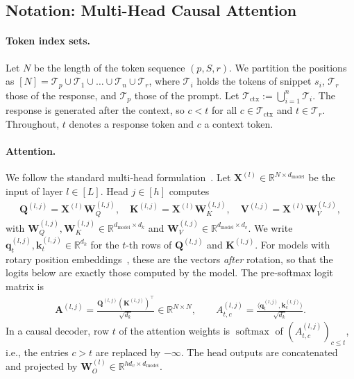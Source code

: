 \documentclass{article}
\begin{document}
\subsection{Notation: Multi-Head Causal Attention}
\label{subsec:attention_notation}

\paragraph{Token index sets.}
Let $N$ be the length of the token sequence $(p, S, r)$. We partition the positions as $[N] = \mathcal{T}_p \cup \mathcal{T}_1 \cup \dots \cup \mathcal{T}_n \cup \mathcal{T}_r$, where $\mathcal{T}_i$ holds the tokens of snippet $s_i$, $\mathcal{T}_r$ those of the response, and $\mathcal{T}_p$ those of the prompt. Let $\mathcal{T}_{\text{ctx}} := \bigcup_{i=1}^n \mathcal{T}_i$. The response is generated after the context, so $c < t$ for all $c \in \mathcal{T}_{\text{ctx}}$ and $t \in \mathcal{T}_r$. Throughout, $t$ denotes a response token and $c$ a context token.

\paragraph{Attention.}
We follow the standard multi-head formulation~\cite{vaswani2017attention, qiu2025gated}. Let $\mathbf{X}^{(l)} \in \mathbb{R}^{N \times d_{\text{model}}}$ be the input of layer $l \in [L]$. Head $j \in [h]$ computes
\begin{align}
    \mathbf{Q}^{(l,j)} = \mathbf{X}^{(l)}\mathbf{W}_Q^{(l,j)}, \quad \mathbf{K}^{(l,j)} = \mathbf{X}^{(l)}\mathbf{W}_K^{(l,j)}, \quad \mathbf{V}^{(l,j)} = \mathbf{X}^{(l)}\mathbf{W}_V^{(l,j)},
\end{align}
with $\mathbf{W}_Q^{(l,j)}, \mathbf{W}_K^{(l,j)} \in \mathbb{R}^{d_{\text{model}} \times d_k}$ and $\mathbf{W}_V^{(l,j)} \in \mathbb{R}^{d_{\text{model}} \times d_v}$. We write $\mathbf{q}_t^{(l,j)}, \mathbf{k}_t^{(l,j)} \in \mathbb{R}^{d_k}$ for the $t$-th rows of $\mathbf{Q}^{(l,j)}$ and $\mathbf{K}^{(l,j)}$. For models with rotary position embeddings~\cite{su2024roformer}, these are the vectors \emph{after} rotation, so that the logits below are exactly those computed by the model. The pre-softmax logit matrix is
\begin{align}\label{eq:sdpa_dot}
    \mathbf{A}^{(l,j)} = \frac{\mathbf{Q}^{(l,j)}(\mathbf{K}^{(l,j)})^\top}{\sqrt{d_k}} \in \mathbb{R}^{N \times N}, \qquad A^{(l,j)}_{t,c} = \frac{\langle \mathbf{q}_t^{(l,j)}, \mathbf{k}_c^{(l,j)} \rangle}{\sqrt{d_k}}.
\end{align}
In a causal decoder, row $t$ of the attention weights is $\operatorname{softmax}$ of $(A^{(l,j)}_{t,c})_{c \le t}$, i.e., the entries $c > t$ are replaced by $-\infty$. The head outputs are concatenated and projected by $\mathbf{W}_O^{(l)} \in \mathbb{R}^{h d_v \times d_{\text{model}}}$.
\end{document}

